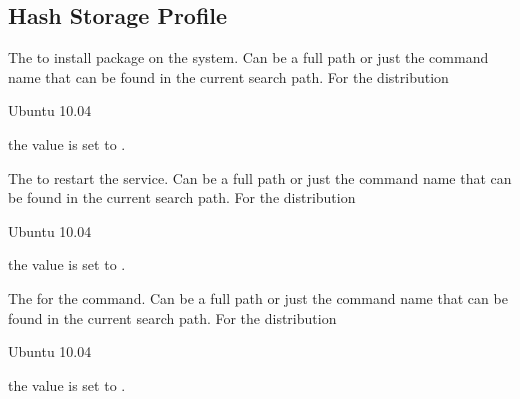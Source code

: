 \label{sec:postfix_hash_profile}
\subsection[Postfix Hash Profile]{Hash Storage Profile}


The  to install package on the system. Can be a full path or
just the command name that can be found in the current search path. 
For the distribution
\begin{inparaitem}
\item[\TheDistribution{ubuntu}] Ubuntu 10.04
\end{inparaitem}
the value is set to .


The  to restart the service. Can be a full path or
just the command name that can be found in the current search path. 
For the distribution
\begin{inparaitem}
\item[\TheDistribution{ubuntu}] Ubuntu 10.04
\end{inparaitem}
the value is set to .


The  for the  command. Can be a full path or
just the command name that can be found in the current search path.
For the distribution
\begin{inparaitem}
\item[\TheDistribution{ubuntu}] Ubuntu 10.04
\end{inparaitem}
the value is set to .


